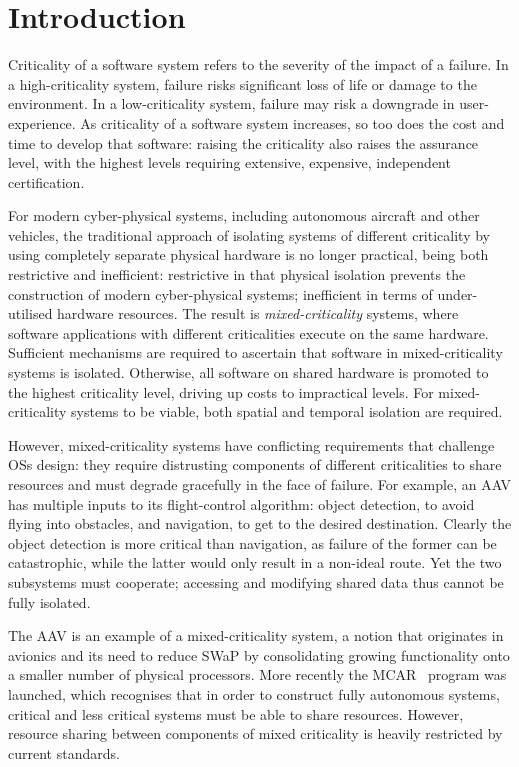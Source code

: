 \chapter{Introduction}

Criticality of a software system refers to the severity of the impact of a failure.
In a high-criticality system, failure risks significant loss of life or damage to the environment.
In a low-criticality system, failure may risk a downgrade in user-experience.
As criticality of a software system increases, so too does the cost and time to develop that
software: raising the criticality also raises the assurance level, with the highest levels requiring
extensive, expensive, independent certification.

For modern cyber-physical systems, including autonomous aircraft and other vehicles, the traditional
approach of isolating systems of different criticality by using completely separate physical
hardware is no
longer practical, being both restrictive and inefficient: restrictive in that physical isolation
prevents the construction of modern cyber-physical systems; inefficient in terms of
under-utilised hardware resources.
The result is \emph{mixed-criticality} systems, where software applications with different criticalities
execute on the same hardware. Sufficient mechanisms are required to ascertain that software in
mixed-criticality systems is isolated. Otherwise, all software on shared hardware is
promoted
to the highest criticality level, driving up costs to impractical levels. For mixed-criticality
systems to be
viable, both spatial and temporal isolation are required.

However, mixed-criticality systems have conflicting requirements that challenge \glspl{OS} design:
they require distrusting components of different criticalities to share resources and must
degrade gracefully in the face of failure.  For example, an \gls{AAV} has multiple inputs to its
flight-control algorithm: object detection, to avoid flying into obstacles, and navigation, to get
to the desired destination.  Clearly the object detection is more critical than navigation, as
failure of the former can be catastrophic, while the latter would only result in a non-ideal route.
Yet the two subsystems must cooperate; accessing and modifying shared data thus cannot be fully
isolated.

The \gls{AAV} is an example of a mixed-criticality system, a notion that originates in avionics and its
need to reduce \gls{SWaP} by consolidating growing functionality onto a smaller
number of physical processors. More recently the
\gls{MCAR}~\citep{Barhorst_BBHPSSSSU_09} program was launched, which recognises that in order to
construct fully autonomous systems, critical and less critical systems must be able to share
resources. However, resource sharing between components of mixed criticality is heavily restricted by current
standards.

